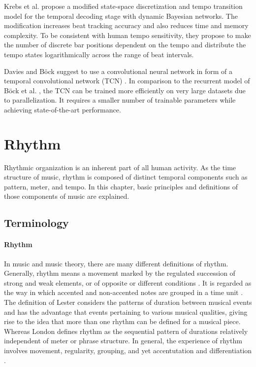 \documentclass{scrartcl}
\begin{document}
Krebs et al. \cite{Krebs2015} propose a modified state-space discretization and tempo transition model for the temporal decoding stage with dynamic Bayesian networks. The modification increases beat tracking accuracy and also reduces time and memory complexity. To be consistent with human tempo sensitivity, they propose to make the number of discrete bar positions dependent on the tempo and distribute the tempo states logarithmically across the range of beat intervals. 

Davies and Böck \cite{Davies2019} suggest to use a convolutional neural network in form of a temporal convolutional network (TCN) \cite{Bai2018}. In comparison to the recurrent model of Böck et al. \cite{Boeck2014}, the TCN can be trained more efficiently on very large datasets due to parallelization. It requires a smaller number of trainable parameters while achieving state-of-the-art performance. 



\newpage
\section{Rhythm}
\label{sec:perception}

Rhythmic organization is an inherent part of all human activity. As the time structure of music, rhythm is composed of distinct temporal components such as pattern, meter, and tempo. In this chapter, basic principles and definitions of those components of music are explained.  


\subsection{Terminology}

\paragraph{Rhythm} 
In music and music theory, there are many different definitions of rhythm. Generally, rhythm means a movement marked by the regulated succession of strong and weak elements, or of opposite or different conditions \cite{Dictionary1971}. It is regarded as the way in which accented and non-accented notes are grouped in a time unit \cite{Cooper1966}. The definition of Lester \cite{Lester1986} considers the patterns of duration between musical events and has the advantage that events pertaining to various musical qualities, giving rise to the idea that more than one rhythm can be defined for a musical piece. Whereas London \cite{London2001} defines rhythm as the sequential pattern of durations relatively independent of meter or phrase structure. In general, the experience of rhythm involves movement, regularity, grouping, and yet accentutation and differentiation \cite{Handel1989}.
\end{document}
